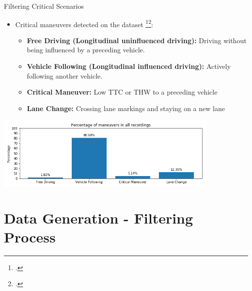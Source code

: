 \documentclass[shortpres]{beamer}
\begin{document}
\begin{frame}{Filtering Critical Scenarios}	

\begin{itemize} 
\fontsize{9pt}{10pt}\selectfont \item Critical maneuvers detected on the dataset \footcite{highDdataset}\footcite{benmimoun2011incident}:
	\begin{itemize} 
	\fontsize{9pt}{10pt}\selectfont \item \textbf{Free Driving (Longitudinal uninfluenced driving):} Driving without being influenced by a preceding vehicle.
	\fontsize{9pt}{10pt}\selectfont \item \textbf{Vehicle Following (Longitudinal influenced driving):} Actively following another vehicle.
	\fontsize{9pt}{10pt}\selectfont \item \textbf{Critical Maneuver:} Low TTC or THW to a preceding vehicle
	\fontsize{9pt}{10pt}\selectfont \item \textbf{Lane Change:} Crossing lane markings and staying on a new lane 
	\end{itemize}	
\end{itemize}

\begin{center}
\includegraphics[width=11cm]{raw_maneuvers}
\end{center}

\end{frame}

\section{Data Generation - Filtering Process}	
\end{document}
